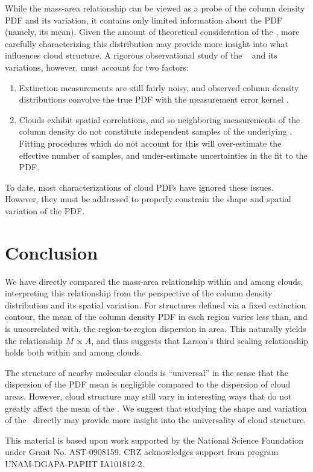 While the mass-area relationship can be viewed as a probe of the column density PDF and its variation, it contains only limited information about the PDF (namely, its mean). Given the amount of theoretical consideration of the \npdf, more carefully characterizing this distribution may provide more insight into what influences cloud structure. A rigorous observational study of the \npdf~ and its variations, however, must account for two factors:
\begin{enumerate}
\item Extinction measurements are still fairly noisy, and observed column density distributions convolve the true PDF with the measurement error kernel \citep{Kelly11}.
\item Clouds exhibit spatial correlations, and so neighboring measurements of the column density do not constitute independent samples of the underlying \npdf. Fitting procedures which do not account for this will over-estimate the effective number of samples, and under-estimate uncertainties in the fit to the PDF.
\end{enumerate}
To date, most characterizations of cloud PDFs have ignored these issues. However, they must be addressed to properly constrain the shape and spatial variation of the PDF.

\section{Conclusion}
We have directly compared the mass-area relationship within and among clouds, interpreting this relationship from the perspective of the column density distribution and its spatial variation. For structures defined via a fixed extinction contour, the mean of the column density PDF in each region varies less than, and is uncorrelated with, the region-to-region dispersion in area. This naturally yields the relationship $M \propto A$, and thus suggests that Larson's third scaling relationship holds both within and among clouds.

The structure of nearby molecular clouds is ``universal'' in the sense that the dispersion of the PDF mean is negligible compared to the dispersion of cloud areas. However, cloud structure may still vary in interesting ways that do not greatly affect the mean of the \npdf. We suggest that studying the shape and variation of the \npdf\, directly may provide more insight into the universality of cloud structure.

This material is based upon work supported by the National Science Foundation under Grant No. AST-0908159. CRZ acknowledges support from program UNAM-DGAPA-PAPIIT IA101812-2.

